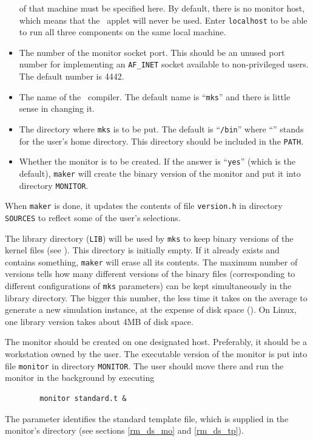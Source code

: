 \begin{itemize}
of that machine must be specified here.
By default, there is no monitor host, which means that the \dsd\ applet
will never be used.
Enter {\tt localhost} to be able to
run all three components on the same local machine.
\item
The number of the monitor socket port.
This should be an unused port number for implementing an {\tt AF\_INET}
socket available to non-privileged users.
The default number is 4442.
\item
The name of the \smurph\ compiler.
The default name is ``{\tt mks}'' and there is little sense in changing it.
\item
The directory where {\tt mks} is to be put.
The default is ``{\tt {}/bin}'' where ``{\tt {}}'' stands for the
user's home directory.
This directory should be included in the {\tt PATH}.
\item
Whether the monitor is to be created.
If the answer is ``{\tt yes}'' (which is the default), {\tt maker} will create
the binary version of the monitor and put it into directory {\tt MONITOR}.
\end{itemize}

When {\tt maker} is done, it updates the contents of file
{\tt version.h} in directory {\tt SOURCES} to reflect some of the user's
selections.

The library directory ({\tt LIB}) will be used by
{\tt mks} to keep binary versions of the kernel files (see ).
This directory is initially empty.
If it already exists and contains something, {\tt maker} will erase all its
contents.
The maximum number of versions tells how many different versions of the binary
files (corresponding to different configurations of {\tt mks} parameters)
can be kept simultaneously in the library directory.
The bigger this number, the less time it takes on the average to generate a
new simulation instance, at the expense of disk space ().
On Linux, one library version takes about 4MB of disk space.

The monitor should be created on one designated host.
Preferably, it should be a workstation owned by the user.
The executable version of the monitor is put into file {\tt monitor}
in directory {\tt MONITOR}.
The user should move there and run the monitor in the background by
executing
\begin{verbatim}
        monitor standard.t &
\end{verbatim}
The parameter identifies the standard template file, which is supplied
in the monitor's directory (see sections \ref{rm_ds_mo} and \ref{rm_ds_tp}).


